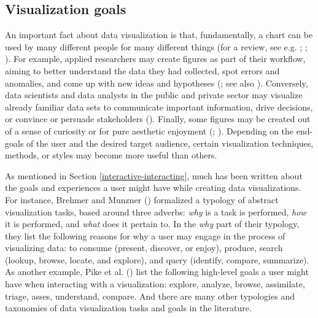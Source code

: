 \documentclass[
]{book}
\theoremstyle{definition}
\theoremstyle{definition}
\theoremstyle{definition}
\theoremstyle{definition}
\theoremstyle{remark}
\begin{document}
\subsection{Visualization goals}\label{visualization-goals}

An important fact about data visualization is that, fundamentally, a chart can be used by many different people for many different things (for a review, see e.g. ; ; ). For example, applied researchers may create figures as part of their workflow, aiming to better understand the data they had collected, spot errors and anomalies, and come up with new ideas and hypotheses (; see also ). Conversely, data scientists and data analysts in the public and private sector may visualize already familiar data sets to communicate important information, drive decisions, or convince or persuade stakeholders (). Finally, some figures may be created out of a sense of curiosity or for pure aesthetic enjoyment (; ). Depending on the end-goals of the user and the desired target audience, certain visualization techniques, methods, or styles may become more useful than others.

As mentioned in Section \ref{interactive-interacting}, much has been written about the goals and experiences a user might have while creating data visualizations. For instance, Brehmer and Munzner () formalized a typology of abstract visualization tasks, based around three adverbs: \emph{why} is a task is performed, \emph{how} it is performed, and \emph{what} does it pertain to. In the \emph{why} part of their typology, they list the following reasons for why a user may engage in the process of visualizing data: to consume (present, discover, or enjoy), produce, search (lookup, browse, locate, and explore), and query (identify, compare, summarize). As another example, Pike et al. () list the following high-level goals a user might have when interacting with a visualization: explore, analyze, browse, assimilate, triage, asses, understand, compare. And there are many other typologies and taxonomies of data visualization tasks and goals in the literature.
\end{document}
